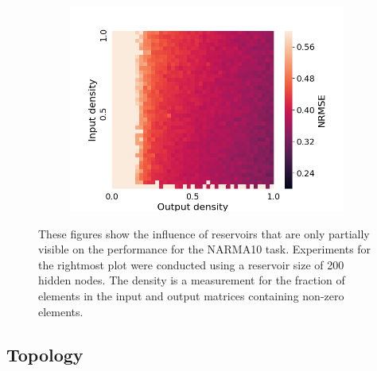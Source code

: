 \begin{figure}[htbp]
\begin{subfigure}{.3\textwidth}
    \includegraphics[width=\linewidth]{img/partial_visibility.png}
  \end{subfigure}
  \caption{
    These figures show the influence of reservoirs that are only partially
visible on the performance for the NARMA10 task. Experiments for the rightmost
plot were conducted using a reservoir size of 200 hidden nodes. The density is a
measurement for the fraction of elements in the input and output matrices
containing non-zero elements.
  }
  \label{performance}
\end{figure}


\subsection{Topology}


